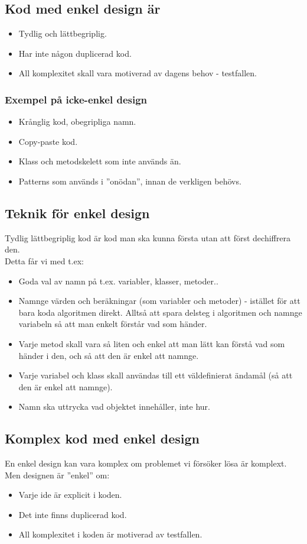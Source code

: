 \documentclass[a4paper]{article}
\begin{document}
\subsection*{Kod med enkel design är}
\begin{itemize}
\item{Tydlig och lättbegriplig.}
\item{Har inte någon duplicerad kod.}
\item{All komplexitet skall vara motiverad av dagens behov - testfallen.}
\end{itemize}
\subsubsection*{Exempel på icke-enkel design}
\begin{itemize}
\item{Krånglig kod, obegripliga namn.}
\item{Copy-paste kod.}
\item{Klass och metodskelett som inte används än.}
\item{Patterns som används i ''onödan'', innan de verkligen behövs.}
\end{itemize}
\subsection*{Teknik för enkel design}
Tydlig lättbegriplig kod är kod man ska kunna första utan att först dechiffrera den. \\
Detta får vi med t.ex:
\begin{itemize}
\item{Goda val av namn på t.ex. variabler, klasser, metoder..}
\item{Namnge värden och beräkningar (som variabler och metoder) - istället för att bara koda algoritmen direkt. Alltså att spara delsteg i algoritmen och namnge variabeln så att man enkelt förstår vad som händer.}
\item{Varje metod skall vara så liten och enkel att man lätt kan förstå vad som händer i den, och så att den är enkel att namnge.}
\item{Varje variabel och klass skall användas till ett väldefinierat ändamål (så att den är enkel att namnge).}
\item{Namn ska uttrycka vad objektet innehåller, inte hur.}
\end{itemize}
\subsection*{Komplex kod med enkel design}
En enkel design kan vara komplex om problemet vi försöker lösa är komplext. \\
Men designen är ''enkel'' om:
\begin{itemize}
\item{Varje ide är explicit i koden.}
\item{Det inte finns duplicerad kod.}
\item{All komplexitet i koden är motiverad av testfallen.}
\end{itemize}
\end{document}
